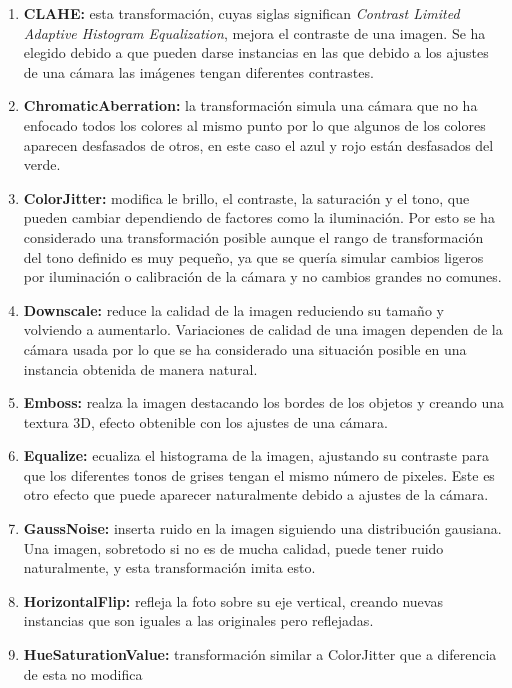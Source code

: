 \documentclass[12pt]{report} %
\begin{document}
    \begin{enumerate} \item \textbf{CLAHE:} esta transformación, cuyas siglas
    significan \textit{Contrast Limited Adaptive Histogram Equalization},
    mejora el contraste de una imagen. Se ha elegido debido a que pueden darse
    instancias en las que debido a los ajustes de una cámara las imágenes
    tengan diferentes contrastes.
    \item \textbf{ChromaticAberration:} la
    transformación simula una cámara que no ha enfocado todos los colores al
    mismo punto por lo que algunos de los colores aparecen desfasados de otros,
    en este caso el azul y rojo están desfasados del verde.
    \item \textbf{ColorJitter:} modifica le brillo, el contraste, la saturación y el
    tono, que pueden cambiar dependiendo de factores como la iluminación. Por
    esto se ha considerado una transformación posible aunque el rango de
    transformación del tono definido es muy pequeño, ya que se quería simular
    cambios ligeros por iluminación o calibración de la cámara y no cambios
    grandes no comunes.
    \item \textbf{Downscale:} reduce la calidad de la
    imagen reduciendo su tamaño y volviendo a aumentarlo.  Variaciones de
    calidad de una imagen dependen de la cámara usada por lo que se ha
    considerado una situación posible en una instancia obtenida de manera
    natural.
    \item \textbf{Emboss:} realza la imagen destacando los bordes de
    los objetos y creando una textura 3D, efecto obtenible con los ajustes de
    una cámara.
    \item \textbf{Equalize:} ecualiza el histograma de la imagen,
    ajustando su contraste para que los diferentes tonos de grises tengan el
    mismo número de pixeles. Este es otro efecto que puede aparecer
    naturalmente debido a ajustes de la cámara.
    \item \textbf{GaussNoise:}
    inserta ruido en la imagen siguiendo una distribución gausiana. Una imagen,
    sobretodo si no es de mucha calidad, puede tener ruido naturalmente, y esta
    transformación imita esto.
    \item \textbf{HorizontalFlip:} refleja la foto
    sobre su eje vertical, creando nuevas instancias que son iguales a las
    originales pero reflejadas.
    \item \textbf{HueSaturationValue:}
    transformación similar a ColorJitter que a diferencia de esta no modifica

\end{enumerate}
\end{document}
